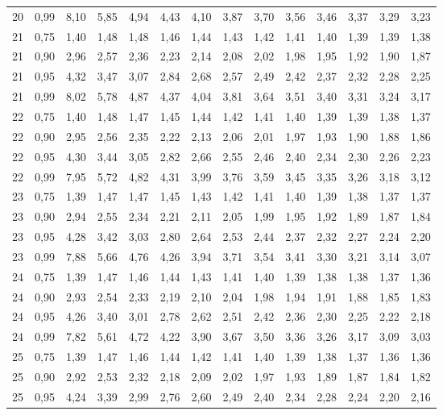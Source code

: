 \documentclass[
]{article}
\begin{document}
\begin{landscape}
\begin{longtable}[t]{cccccccccccccc}
20 & 0,99 & 8,10 & 5,85 & 4,94 & 4,43 & 4,10 & 3,87 & 3,70 & 3,56 & 3,46 & 3,37 & 3,29 & 3,23\\
21 & 0,75 & 1,40 & 1,48 & 1,48 & 1,46 & 1,44 & 1,43 & 1,42 & 1,41 & 1,40 & 1,39 & 1,39 & 1,38\\
21 & 0,90 & 2,96 & 2,57 & 2,36 & 2,23 & 2,14 & 2,08 & 2,02 & 1,98 & 1,95 & 1,92 & 1,90 & 1,87\\
21 & 0,95 & 4,32 & 3,47 & 3,07 & 2,84 & 2,68 & 2,57 & 2,49 & 2,42 & 2,37 & 2,32 & 2,28 & 2,25\\
21 & 0,99 & 8,02 & 5,78 & 4,87 & 4,37 & 4,04 & 3,81 & 3,64 & 3,51 & 3,40 & 3,31 & 3,24 & 3,17\\
22 & 0,75 & 1,40 & 1,48 & 1,47 & 1,45 & 1,44 & 1,42 & 1,41 & 1,40 & 1,39 & 1,39 & 1,38 & 1,37\\
22 & 0,90 & 2,95 & 2,56 & 2,35 & 2,22 & 2,13 & 2,06 & 2,01 & 1,97 & 1,93 & 1,90 & 1,88 & 1,86\\
22 & 0,95 & 4,30 & 3,44 & 3,05 & 2,82 & 2,66 & 2,55 & 2,46 & 2,40 & 2,34 & 2,30 & 2,26 & 2,23\\
22 & 0,99 & 7,95 & 5,72 & 4,82 & 4,31 & 3,99 & 3,76 & 3,59 & 3,45 & 3,35 & 3,26 & 3,18 & 3,12\\
23 & 0,75 & 1,39 & 1,47 & 1,47 & 1,45 & 1,43 & 1,42 & 1,41 & 1,40 & 1,39 & 1,38 & 1,37 & 1,37\\
23 & 0,90 & 2,94 & 2,55 & 2,34 & 2,21 & 2,11 & 2,05 & 1,99 & 1,95 & 1,92 & 1,89 & 1,87 & 1,84\\
23 & 0,95 & 4,28 & 3,42 & 3,03 & 2,80 & 2,64 & 2,53 & 2,44 & 2,37 & 2,32 & 2,27 & 2,24 & 2,20\\
23 & 0,99 & 7,88 & 5,66 & 4,76 & 4,26 & 3,94 & 3,71 & 3,54 & 3,41 & 3,30 & 3,21 & 3,14 & 3,07\\
24 & 0,75 & 1,39 & 1,47 & 1,46 & 1,44 & 1,43 & 1,41 & 1,40 & 1,39 & 1,38 & 1,38 & 1,37 & 1,36\\
24 & 0,90 & 2,93 & 2,54 & 2,33 & 2,19 & 2,10 & 2,04 & 1,98 & 1,94 & 1,91 & 1,88 & 1,85 & 1,83\\
24 & 0,95 & 4,26 & 3,40 & 3,01 & 2,78 & 2,62 & 2,51 & 2,42 & 2,36 & 2,30 & 2,25 & 2,22 & 2,18\\
24 & 0,99 & 7,82 & 5,61 & 4,72 & 4,22 & 3,90 & 3,67 & 3,50 & 3,36 & 3,26 & 3,17 & 3,09 & 3,03\\
25 & 0,75 & 1,39 & 1,47 & 1,46 & 1,44 & 1,42 & 1,41 & 1,40 & 1,39 & 1,38 & 1,37 & 1,36 & 1,36\\
25 & 0,90 & 2,92 & 2,53 & 2,32 & 2,18 & 2,09 & 2,02 & 1,97 & 1,93 & 1,89 & 1,87 & 1,84 & 1,82\\
25 & 0,95 & 4,24 & 3,39 & 2,99 & 2,76 & 2,60 & 2,49 & 2,40 & 2,34 & 2,28 & 2,24 & 2,20 & 2,16\\

\end{longtable}
\end{landscape}
\end{document}
